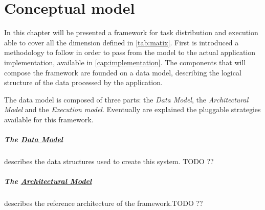 \chapter{Conceptual model}
\label{cap:model}











\newcommand{\model}{\emph{architectural model}}

In this chapter will be presented a framework for task distribution and execution
able to cover all the dimension defined in \autoref{tab:matix}.
First is introduced a methodology to follow in order to pass from the model to the
actual application implementation, available in \autoref{cap:implementation}.
The components that will compose the framework are founded on a data model, describing the logical structure of the data processed by the application.

The data model is composed of three parts: the \emph{Data Model}, the
\emph{Architectural Model} and the \emph{Execution model}. Eventually are
explained the pluggable strategies available for this framework.


\paragraph{The \hyperref[sec:model:data]{Data Model}} describes the data structures
used to create this system. TODO ??

\paragraph{The \hyperref[sec:model:architecture]{Architectural Model}} describes
the reference architecture of the framework.TODO ??

